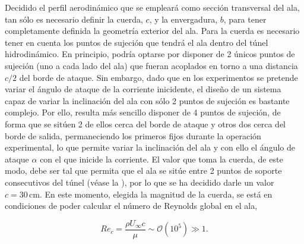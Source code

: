 Decidido el perfil aerodinámico que se empleará como sección transversal del ala, tan sólo es necesario definir la cuerda, $c$, y la envergadura, $b$, para tener completamente definida la geometría exterior del ala. Para la cuerda es necesario tener en cuenta los puntos de sujeción que tendrá el ala dentro del túnel hidrodinámico. En principio, podría optarse por disponer de 2 únicos puntos de sujeción (uno a cada lado del ala) que fueran acoplados en torno a una distancia $c/2$ del borde de ataque. Sin embargo, dado que en los experimentos se pretende variar el ángulo de ataque de la corriente inicidente, el diseño de un sistema capaz de variar la inclinación del ala con sólo 2 puntos de sujeción es bastante complejo. Por ello, resulta más sencillo disponer de 4 puntos de sujeción, de forma que se sitúen 2 de ellos cerca del borde de ataque y otros dos cerca del borde de salida, permaneciendo los primeros fijos durante la operación experimental, lo que permite variar la inclinación del ala y con ello el ángulo de ataque $\alpha$ con el que inicide la corriente. El valor que toma la cuerda, de este modo, debe ser tal que permita que el ala se sitúe entre 2 puntos de soporte consecutivos del túnel (véase la ), por lo que se ha decidido darle un valor $c = 30\,\mathrm{cm}$. En este momento, elegida la magnitud de la cuerda,   se está en condiciones de poder calcular el número de Reynolds global en el ala, 

\begin{equation}
Re_{c}  = \dfrac{\rho U_{\infty} c}{\mu} \sim \mathcal{O}\left(10^{5}\right) \gg 1. 
\end{equation}

